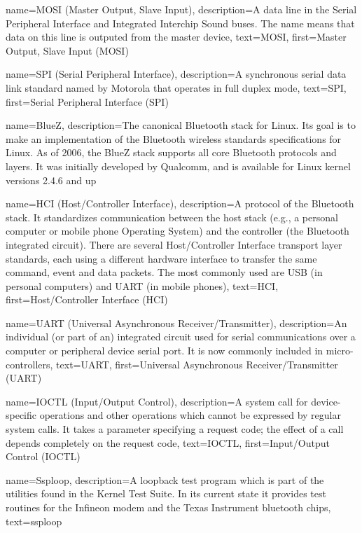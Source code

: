 {
  name={MOSI (Master Output, Slave Input)},
  description={A data line in the Serial Peripheral Interface and
    Integrated Interchip Sound buses. The name means that data on this
    line is outputed from the master device},
  text=MOSI,
  first={Master Output, Slave Input (MOSI)}
}

{
  name=SPI (Serial Peripheral Interface),
  description={A synchronous serial data link standard named by
    Motorola that operates in full duplex mode},
  text=SPI,
  first=Serial Peripheral Interface (SPI)
}

{
  name=BlueZ,
  description={The canonical Bluetooth stack for Linux. Its goal is to
    make an implementation of the Bluetooth wireless standards
    specifications for Linux. As of 2006, the BlueZ stack supports all
    core Bluetooth protocols and layers. It was initially developed by
    Qualcomm, and is available for Linux kernel versions 2.4.6 and up}
}

{
  name=HCI (Host/Controller Interface),
  description={A protocol of the Bluetooth stack. It standardizes
    communication between the host stack (e.g., a personal computer or
    mobile phone Operating System) and the controller (the Bluetooth
    integrated circuit). There are several Host/Controller Interface
    transport layer standards, each using a different hardware
    interface to transfer the same command, event and data
    packets. The most commonly used are USB (in personal computers)
    and UART (in mobile phones)},
  text=HCI,
  first=Host/Controller Interface (HCI)
}

{
  name=UART (Universal Asynchronous Receiver/Transmitter),
  description={An individual (or part of an) integrated circuit used
    for serial communications over a computer or peripheral device
    serial port. It is now commonly included in micro-controllers},
  text=UART,
  first=Universal Asynchronous Receiver/Transmitter (UART)
}

{
  name=IOCTL (Input/Output Control),
  description={A system call for device-specific operations and other
    operations which cannot be expressed by regular system calls. It
    takes a parameter specifying a request code; the effect of a call
    depends completely on the request code},
  text=IOCTL,
  first=Input/Output Control (IOCTL)
}

{
  name=Ssploop,
  description={A loopback test program which is part of the utilities
    found in the Kernel Test Suite. In its current state it provides
    test routines for the Infineon modem and the Texas Instrument
    bluetooth chips},
  text=ssploop
}

